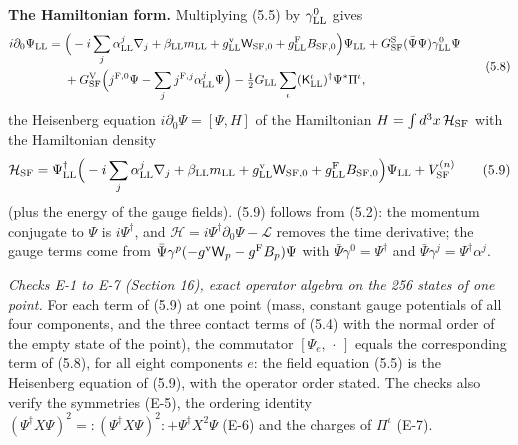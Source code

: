 \documentclass[
  10pt,
]{article}
\begin{document}
\textbf{The Hamiltonian form.} Multiplying (5.5) by
\(\gamma^0_{\rm LL}\) gives
\[\begin{aligned}i\partial_0\Psi_{\rm LL}={}&\Big(-i\sum_j\alpha^j_{\rm LL}\nabla_j+\beta_{\rm LL}m_{\rm LL}+g^{\rm v}_{\rm LL}\mathsf W_{{\rm SF},0}+g^{\rm F}_{\rm LL}B_{{\rm SF},0}\Big)\Psi_{\rm LL}+G^{\rm S}_{\rm SF}(\bar\Psi\Psi)\gamma^0_{\rm LL}\Psi\\&+G^{\rm V}_{\rm SF}\Big(j^{{\rm F},0}\Psi-\sum_jj^{{\rm F},j}\alpha^j_{\rm LL}\Psi\Big)-\tfrac12G_{\rm LL}\sum_\iota(\mathsf K^\iota_{\rm LL})^\dagger\Psi^*\Pi^\iota,\end{aligned}\tag{5.8}\]
the Heisenberg equation \(i\partial_0\Psi=[\Psi,H]\) of the Hamiltonian
\(H=\int d^3x\,\mathcal H_{\rm SF}\) with the Hamiltonian density
\[\mathcal H_{\rm SF}=\Psi^\dagger_{\rm LL}\Big(-i\sum_j\alpha^j_{\rm LL}\nabla_j+\beta_{\rm LL}m_{\rm LL}+g^{\rm v}_{\rm LL}\mathsf W_{{\rm SF},0}+g^{\rm F}_{\rm LL}B_{{\rm SF},0}\Big)\Psi_{\rm LL}+V^{(n)}_{\rm SF}\tag{5.9}\]
(plus the energy of the gauge fields). (5.9) follows from (5.2): the
momentum conjugate to \(\Psi\) is \(i\Psi^\dagger\), and
\(\mathcal H=i\Psi^\dagger\partial_0\Psi-\mathcal L\) removes the time
derivative; the gauge terms come from
\(\bar\Psi\gamma^p(-g^{\rm v}\mathsf W_p-g^{\rm F}B_p)\Psi\) with
\(\bar\Psi\gamma^0=\Psi^\dagger\) and
\(\bar\Psi\gamma^j=\Psi^\dagger\alpha^j\).

\emph{Checks E-1 to E-7 (Section 16), exact operator algebra on the 256
states of one point.} For each term of (5.9) at one point (mass,
constant gauge potentials of all four components, and the three contact
terms of (5.4) with the normal order of the empty state of the point),
the commutator \([\Psi_e,\,\cdot\,]\) equals the corresponding term of
(5.8), for all eight components \(e\): the field equation (5.5) is the
Heisenberg equation of (5.9), with the operator order stated. The checks
also verify the symmetries (E-5), the ordering identity
\((\Psi^\dagger X\Psi)^2={:}(\Psi^\dagger X\Psi)^2{:}+\Psi^\dagger X^2\Psi\)
(E-6) and the charges of \(\Pi^\iota\) (E-7).
\end{document}
